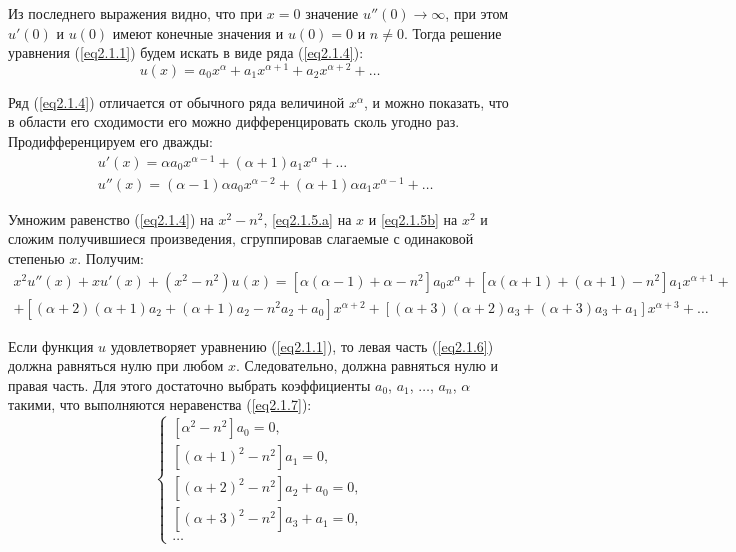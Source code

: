     Из последнего выражения видно, что при \( x = 0 \) значение \( u''(0)\to\infty \), при этом \( u'(0) \) и \( u(0) \) имеют конечные значения и \( u(0) = 0 \) и \( n\ne 0\). Тогда решение уравнения (\ref{eq2.1.1}) будем искать в виде ряда (\ref{eq2.1.4}):
    \begin{equation}
        u(x) = a_0x^\alpha + a_1x^{\alpha+1} + a_2x^{\alpha+2} + \ldots
        \label{eq2.1.4}
    \end{equation}
    
    Ряд (\ref{eq2.1.4}) отличается от обычного ряда величиной \( x^\alpha \), и можно
    показать, что в области его сходимости его можно дифференцировать сколь
    угодно раз. Продифференцируем его дважды:
    \begin{align}
        & u'(x) = \alpha a_0x^{\alpha-1} + (\alpha+1)a_1x^\alpha + \ldots \label{eq2.1.5a} \\
        & u''(x) = (\alpha-1)\alpha a_0x^{\alpha-2} + (\alpha+1)\alpha a_1x^{\alpha-1} + \ldots
        \label{eq2.1.5b}
    \end{align}
    
    Умножим равенство (\ref{eq2.1.4}) на \( x^2-n^2 \), \eqref{eq2.1.5.a} на \( x \) и
    \eqref{eq2.1.5b} на \( x^2 \) и сложим получившиеся произведения, сгруппировав
    слагаемые с одинаковой степенью \( x \). Получим:
    \begin{equation}
        \begin{array}{l}
            x^2 u''(x) + xu'(x) + (x^2-n^2)u(x) = [\alpha(\alpha - 1) + \alpha -
            n^2]a_0x^\alpha + [\alpha(\alpha + 1) + (\alpha + 1) - n^2]a_1
            x^{\alpha + 1} + \\ + [(\alpha + 2)(\alpha + 1)a_2 + (\alpha + 1)a_2
            - n^2a_2 + a_0]x^{\alpha + 2} + [(\alpha + 3)(\alpha + 2)a_3 + (\alpha
            + 3)a_3 + a_1]x^{\alpha + 3} + \ldots
        \end{array} \label{eq2.1.6}
    \end{equation}
    
    Если функция \( u \) удовлетворяет уравнению (\ref{eq2.1.1}), то левая часть
    (\ref{eq2.1.6}) должна равняться нулю при любом \( x \). Следовательно, должна
    равняться нулю и правая часть. Для этого достаточно выбрать коэффициенты
    \( a_0 \), \( a_1 \), \( \ldots \), \( a_n \), \( \alpha \) такими, что
    выполняются неравенства (\ref{eq2.1.7}):
    \begin{equation}
        \left\{
        \begin{array}{l}
            \left[\alpha^2 - n^2\right] a_0 = 0, \\
            \left[(\alpha + 1)^2 - n^2\right]a_1 = 0, \\
            \left[(\alpha + 2)^2 - n^2\right]a_2 + a_0 = 0, \\
            \left[(\alpha + 3)^2 - n^2\right]a_3 + a_1 = 0, \\
            \ldots
        \end{array}
        \right.
        \label{eq2.1.7}
    \end{equation}
    
